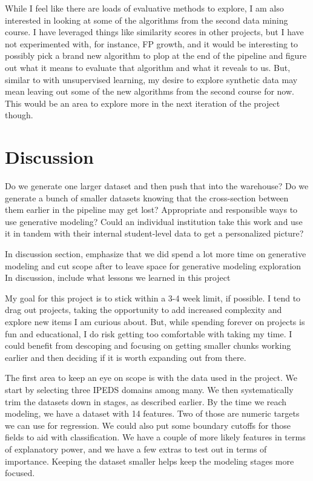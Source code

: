 \documentclass[sigconf, authorversion, nonacm]{acmart}
\begin{document}
    While I feel like there are loads of evaluative methods to explore, I am also interested in looking at some of the algorithms from the second data mining course. I have leveraged things like similarity scores in other projects, but I have not experimented with, for instance, FP growth, and it would be interesting to possibly pick a brand new algorithm to plop at the end of the pipeline and figure out what it means to evaluate that algorithm and what it reveals to us. But, similar to with unsupervised learning, my desire to explore synthetic data may mean leaving out some of the new algorithms from the second course for now. This would be an area to explore more in the next iteration of the project though.

\section{Discussion}


    Do we generate one larger dataset and then push that into the warehouse? Do we generate a bunch of smaller datasets knowing that the cross-section between them earlier in the pipeline may get lost?
    Appropriate and responsible ways to use generative modeling?
    Could an individual institution take this work and use it in tandem with their internal student-level data to get a personalized picture?

    In discussion section, emphasize that we did spend a lot more time on generative modeling and cut scope after to leave space for generative modeling exploration
    In discussion, include what lessons we learned in this project





    My goal for this project is to stick within a 3-4 week limit, if possible. I tend to drag out projects, taking the opportunity to add increased complexity and explore new items I am curious about. But, while spending forever on projects is fun and educational, I do risk getting too comfortable with taking my time. I could benefit from descoping and focusing on getting smaller chunks working earlier and then deciding if it is worth expanding out from there.

    The first area to keep an eye on scope is with the data used in the project. We start by selecting three IPEDS domains among many. We then systematically trim the datasets down in stages, as described earlier. By the time we reach modeling, we have a dataset with 14 features. Two of those are numeric targets we can use for regression. We could also put some boundary cutoffs for those fields to aid with classification. We have a couple of more likely features in terms of explanatory power, and we have a few extras to test out in terms of importance. Keeping the dataset smaller helps keep the modeling stages more focused.
\end{document}
